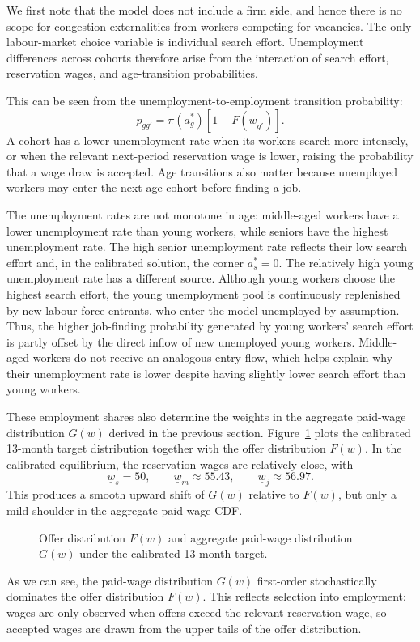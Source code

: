 \documentclass{article}
\begin{document}
We first note that the model does not include a firm side, and hence there is no scope for congestion externalities from workers competing for vacancies. The only labour-market choice variable is individual search effort. Unemployment differences across cohorts therefore arise from the interaction of search effort, reservation wages, and age-transition probabilities.

This can be seen from the unemployment-to-employment transition probability:
\[
p_{gg'}=\pi(a_g^*)\left[1-F(\underline w_{g'})\right].
\]
A cohort has a lower unemployment rate when its workers search more intensely, or when the relevant next-period reservation wage is lower, raising the probability that a wage draw is accepted. Age transitions also matter because unemployed workers may enter the next age cohort before finding a job.

The unemployment rates are not monotone in age: middle-aged workers have a lower unemployment rate than young workers, while seniors have the highest unemployment rate. The high senior unemployment rate reflects their low search effort and, in the calibrated solution, the corner $a_s^*=0$. The relatively high young unemployment rate has a different source. Although young workers choose the highest search effort, the young unemployment pool is continuously replenished by new labour-force entrants, who enter the model unemployed by assumption. Thus, the higher job-finding probability generated by young workers' search effort is partly offset by the direct inflow of new unemployed young workers. Middle-aged workers do not receive an analogous entry flow, which helps explain why their unemployment rate is lower despite having slightly lower search effort than young workers.

These employment shares also determine the weights in the aggregate paid-wage distribution $G(w)$ derived in the previous section. Figure~\ref{fig:wage_distribution} plots the calibrated 13-month target distribution together with the offer distribution $F(w)$. In the calibrated equilibrium, the reservation wages are relatively close, with
\[
\underline w_s=50,\qquad \underline w_m\approx 55.43,\qquad \underline w_j\approx 56.97.
\]
This produces a smooth upward shift of $G(w)$ relative to $F(w)$, but only a mild shoulder in the aggregate paid-wage CDF.

\begin{figure}[!ht]
\centering

\caption{Offer distribution $F(w)$ and aggregate paid-wage distribution $G(w)$ under the calibrated 13-month target.}
\label{fig:wage_distribution}
\end{figure}
As we can see, the paid-wage distribution $G(w)$ first-order stochastically dominates the offer distribution $F(w)$. This reflects selection into employment: wages are only observed when offers exceed the relevant reservation wage, so accepted wages are drawn from the upper tails of the offer distribution.
\end{document}
